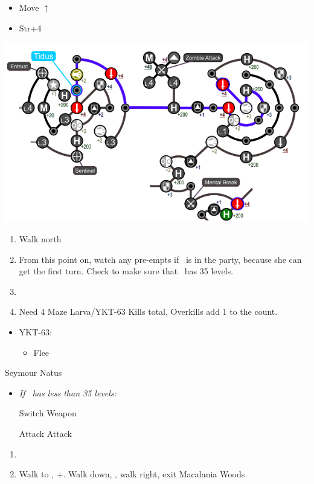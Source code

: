 \begin{spheregrid}
\begin{itemize}
\begin{itemize}
            \item Move $\uparrow$
            \item Str+4
          \end{itemize}
          \includegraphics[width=.9\columnwidth]{graphics/Yuna_blitz_loss_highbridge_1}
  \end{itemize}
\end{spheregrid}
\begin{enumerate}
  \item Walk north
  \item From this point on, watch any pre-empts if \yuna\ is in the party, because she can get the first turn. Check to make sure that \lulu\ has 35 levels.
  \item \formation{\tidus}{\yuna}{\auron}
  \item Need 4 Maze Larva/YKT-63 Kills total, Overkills add 1 to the count.
\end{enumerate}
\begin{encounters}
  \begin{itemize}
    \item YKT-63:
          \begin{itemize}
            \tidusf Attack
            \yunaf Attack
            \item Flee
          \end{itemize}
  \end{itemize}
\end{encounters}
\begin{battle}[36000]{Seymour Natus}
  \begin{itemize}
    \item \textit{If \lulu\ has less than 35 levels:}
          \begin{itemize}
            \switch{\tidus}{\lulu}
            \luluf Switch Weapon
            \switch{\lulu}{\tidus}
          \end{itemize}
          \tidusf Attack
          \summon{\bahamut}
          \bahamutf Attack
  \end{itemize}
\end{battle}
\begin{enumerate}[resume]
  \item \sd
  \item Walk to \yuna, \cs+\skippablefmv[10:10]. Walk down, \cs[1:40], walk right, exit Macalania Woods
\end{enumerate}